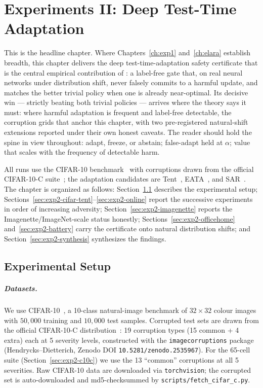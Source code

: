 \chapter{Experiments II: Deep Test-Time Adaptation}\label{ch:exp2}

This is the headline chapter.  Where Chapters~\ref{ch:exp1} and~\ref{ch:elara} establish
breadth, this chapter delivers the deep test-time-adaptation safety certificate that is
the central empirical contribution of \KBound: a label-free gate that, on real neural
networks under distribution shift, never falsely commits to a harmful update, and matches
the better trivial policy when one is already near-optimal.  Its decisive win --- strictly
beating both trivial policies --- arrives where the theory says it must: where harmful
adaptation is frequent and label-free detectable, the corruption grids that anchor this
chapter, with two pre-registered natural-shift extensions reported under their own honest
caveats.  The reader should hold the spine in view throughout: adapt, freeze, or abstain;
false-adapt held at $\alpha$; value that scales with the frequency of detectable harm.

All runs use the CIFAR-10 benchmark~\cite{krizhevsky2009cifar} with corruptions drawn from
the official CIFAR-10-C suite~\cite{hendrycks2019benchmarking}; the adaptation candidates
are Tent~\cite{wang2021tent}, EATA~\cite{niu2022eata}, and SAR~\cite{niu2023sar}.  The
chapter is organized as follows: Section~\ref{sec:exp2-setup} describes the experimental
setup; Sections~\ref{sec:exp2-cifar-tent}--\ref{sec:exp2-online} report the successive
experiments in order of increasing adversity; Section~\ref{sec:exp2-imagenette} reports
the Imagenette/ImageNet-scale status honestly; Sections~\ref{sec:exp2-officehome}
and~\ref{sec:exp2-battery} carry the certificate onto natural distribution shifts; and
Section~\ref{sec:exp2-synthesis} synthesizes the findings.

\section{Experimental Setup}\label{sec:exp2-setup}

\paragraph{Datasets.}
We use CIFAR-10~\cite{krizhevsky2009cifar}, a 10-class natural-image
benchmark of $32{\times}32$ colour images with $50{,}000$ training and
$10{,}000$ test samples.  Corrupted test sets are drawn from the official
CIFAR-10-C distribution~\cite{hendrycks2019benchmarking}: 19 corruption
types (15 common + 4 extra) each at 5 severity levels, constructed with the
\texttt{imagecorruptions} package (Hendrycks--Dietterich, Zenodo DOI
\texttt{10.5281/zenodo.2535967}).  For the 65-cell suite
(Section~\ref{sec:exp2-c10c}) we use the 13 ``common'' corruptions at all
5 severities.  Raw CIFAR-10 data are downloaded via \texttt{torchvision};
the corrupted set is auto-downloaded and md5-checksummed by
\texttt{scripts/fetch\_cifar\_c.py}.

